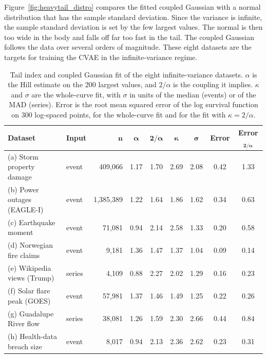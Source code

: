 \documentclass[twoside,11pt]{article}
\begin{document}
Figure~\ref{fig:heavytail_distro} compares the fitted coupled Gaussian with a normal distribution that has the sample standard deviation. Since the variance is infinite, the sample standard deviation is set by the few largest values. The normal is then too wide in the body and falls off far too fast in the tail. The coupled Gaussian follows the data over several orders of magnitude. These eight datasets are the targets for training the CVAE in the infinite-variance regime.

\begin{table}[ht!]
\centering
\renewcommand{\arraystretch}{1.25}
\setlength{\tabcolsep}{4pt}
\footnotesize
\begin{tabular}{llrcccccc}
\toprule
\rowcolor{gray!20}
\textbf{Dataset} & \textbf{Input} & $\boldsymbol{n}$ & $\boldsymbol{\alpha}$ & $\boldsymbol{2/\alpha}$ &
$\boldsymbol{\kappa}$ & $\boldsymbol{\sigma}$ & \textbf{Error} & \textbf{Error}$\boldsymbol{_{2/\alpha}}$ \\
\midrule
(a) Storm property damage & event & 409{,}066 & 1.17 & 1.70 & 2.69 & 2.08 & 0.42 & 1.33 \\
(b) Power outages (EAGLE-I) & event & 1{,}385{,}389 & 1.22 & 1.64 & 1.86 & 1.62 & 0.34 & 0.63 \\
(c) Earthquake moment & event & 71{,}081 & 0.94 & 2.14 & 2.58 & 1.33 & 0.20 & 0.58 \\
(d) Norwegian fire claims & event & 9{,}181 & 1.36 & 1.47 & 1.37 & 1.04 & 0.09 & 0.14 \\
(e) Wikipedia views (Trump) & series & 4{,}109 & 0.88 & 2.27 & 2.02 & 1.29 & 0.16 & 0.23 \\
(f) Solar flare peak (GOES) & event & 57{,}981 & 1.37 & 1.46 & 1.49 & 1.25 & 0.22 & 0.26 \\
(g) Guadalupe River flow & series & 38{,}081 & 1.26 & 1.59 & 2.30 & 2.66 & 0.44 & 0.84 \\
(h) Health-data breach size & event & 8{,}017 & 0.94 & 2.13 & 2.36 & 2.62 & 0.23 & 0.31 \\
\bottomrule
\end{tabular}
\caption{Tail index and coupled Gaussian fit of the eight infinite-variance datasets. $\alpha$ is the Hill estimate on the 200 largest values, and $2/\alpha$ is the coupling it implies. $\kappa$ and $\sigma$ are the whole-curve fit, with $\sigma$ in units of the median (events) or of the MAD (series). Error is the root mean squared error of the log survival function on 300 log-spaced points, for the whole-curve fit and for the fit with $\kappa=2/\alpha$.}
\label{tab:heavytail_fit}
\end{table}
\end{document}
